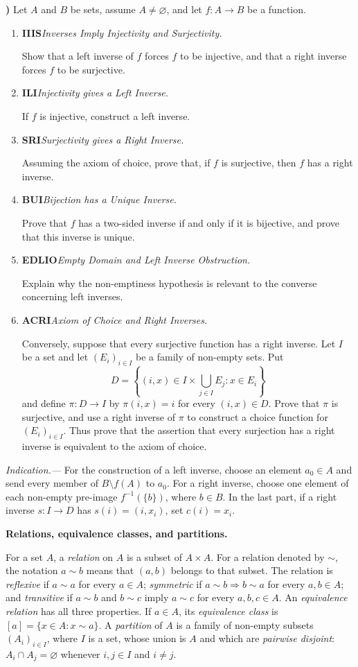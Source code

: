 \documentclass[10pt,a4paper]{article}
\newcounter{examquestion}
\newcommand{\examquestion}[1]{%
  \Needspace{5\baselineskip}%
  \refstepcounter{examquestion}%
  \par\addvspace{0.8\baselineskip}%
  \noindent\textbf{\theexamquestion)}\enspace #1\par
}
\newenvironment{subquestions}
  {\begin{enumerate}[label=\alph*),leftmargin=2.1em]}
  {\end{enumerate}}
\newcommand{\nameditem}[2]{%
  \textbf{\textsf{#1}}\enspace\emph{#2.}\enspace
}
\newcommand{\indication}[1]{%
  \par\smallskip\noindent\emph{Indication.---} #1\par
}
\newcommand{\concept}[1]{%
  \par\addvspace{0.55\baselineskip}\noindent\textbf{#1.}\enspace
}
\begin{document}
\examquestion{\label{q:inverses}
Let $A$ and $B$ be sets, assume $A\ne\varnothing$, and let
$f\colon A\to B$ be a function.
\begin{subquestions}
  \item \nameditem{IIIS}{Inverses Imply Injectivity and Surjectivity}
  Show that a left inverse of $f$ forces $f$ to be injective, and that
  a right inverse forces $f$ to be surjective.
  \item \nameditem{ILI}{Injectivity gives a Left Inverse}
  If $f$ is injective, construct a left inverse.
  \item \nameditem{SRI}{Surjectivity gives a Right Inverse}
  Assuming the axiom of choice, prove that, if $f$ is surjective,
  then $f$ has a right inverse.
  \item \nameditem{BUI}{Bijection has a Unique Inverse}
  Prove that $f$ has a two-sided inverse if and only if it is
  bijective, and prove that this inverse is unique.
  \item \nameditem{EDLIO}{Empty Domain and Left Inverse Obstruction}
  Explain why the non-emptiness hypothesis is relevant to the
  converse concerning left inverses.
  \item \nameditem{ACRI}{Axiom of Choice and Right Inverses}
  Conversely, suppose that every surjective function has a right
  inverse.  Let $I$ be a set and let $(E_i)_{i\in I}$ be a family of
  non-empty sets.  Put
  \[
    D=\left\{(i,x)\in I\times\bigcup_{j\in I}E_j:x\in E_i\right\}
  \]
  and define $\pi\colon D\to I$ by $\pi(i,x)=i$ for every
  $(i,x)\in D$.  Prove that $\pi$ is surjective, and use a right inverse
  of $\pi$ to construct a choice function for $(E_i)_{i\in I}$.  Thus
  prove that the assertion that every surjection has a right inverse is
  equivalent to the axiom of choice.
\end{subquestions}}
\indication{For the construction of a left inverse, choose an element
$a_0\in A$ and send every member of $B\setminus f(A)$ to $a_0$.  For a
right inverse, choose one element of each non-empty pre-image
$f^{-1}(\{b\})$, where $b\in B$.  In the last part, if a right inverse
$s\colon I\to D$ has $s(i)=(i,x_i)$, set $c(i)=x_i$.}

\concept{Relations, equivalence classes, and partitions}
For a set $A$, a \emph{relation} on $A$ is a subset of $A\times A$.
For a relation denoted by $\sim$, the notation $a\sim b$ means that
$(a,b)$ belongs to that subset.  The relation is \emph{reflexive} if
$a\sim a$ for every $a\in A$; \emph{symmetric} if
$a\sim b\Rightarrow b\sim a$ for every $a,b\in A$; and
\emph{transitive} if $a\sim b$ and $b\sim c$ imply $a\sim c$ for every
$a,b,c\in A$.  An \emph{equivalence relation} has all three properties.
If $a\in A$, its \emph{equivalence class} is
$[a]=\{x\in A:x\sim a\}$.  A \emph{partition} of $A$ is a family of
non-empty subsets $(A_i)_{i\in I}$, where $I$ is a set, whose union is $A$
and which are \emph{pairwise disjoint}: $A_i\cap A_j=\varnothing$ whenever
$i,j\in I$ and $i\ne j$.
\end{document}
